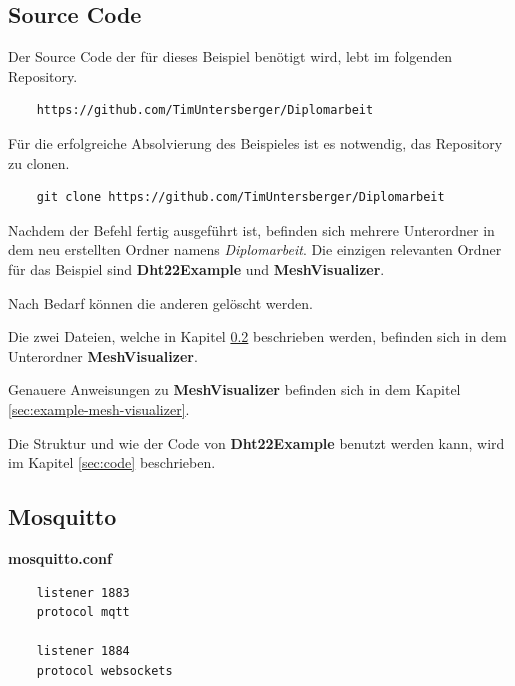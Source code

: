 \subsection{Source Code}\label{sec:example-source-code}

Der Source Code der für dieses Beispiel benötigt wird, lebt im folgenden Repository.

\vspace*{10px}
\begin{verbatim}
    https://github.com/TimUntersberger/Diplomarbeit
\end{verbatim}
\vspace*{10px}

Für die erfolgreiche Absolvierung des Beispieles ist es notwendig, das Repository zu clonen.

\vspace*{10px}
\begin{verbatim}
    git clone https://github.com/TimUntersberger/Diplomarbeit
\end{verbatim}
\vspace*{10px}

Nachdem der Befehl fertig ausgeführt ist, befinden sich mehrere Unterordner in dem neu erstellten Ordner namens \textit{Diplomarbeit}. Die einzigen relevanten Ordner für das Beispiel sind \textbf{Dht22Example} und \textbf{MeshVisualizer}.

Nach Bedarf können die anderen gelöscht werden.

Die zwei Dateien, welche in Kapitel \ref{sec:mosquitto} beschrieben werden, befinden sich in dem Unterordner \textbf{MeshVisualizer}.

Genauere Anweisungen zu \textbf{MeshVisualizer} befinden sich in dem Kapitel \ref{sec:example-mesh-visualizer}.

Die Struktur und wie der Code von \textbf{Dht22Example} benutzt werden kann, wird im Kapitel \ref{sec:code} beschrieben.

\subsection{Mosquitto}\label{sec:mosquitto}

\textbf{mosquitto.conf}
\begin{verbatim}
    listener 1883
    protocol mqtt

    listener 1884
    protocol websockets
\end{verbatim}
\vspace*{10px}

